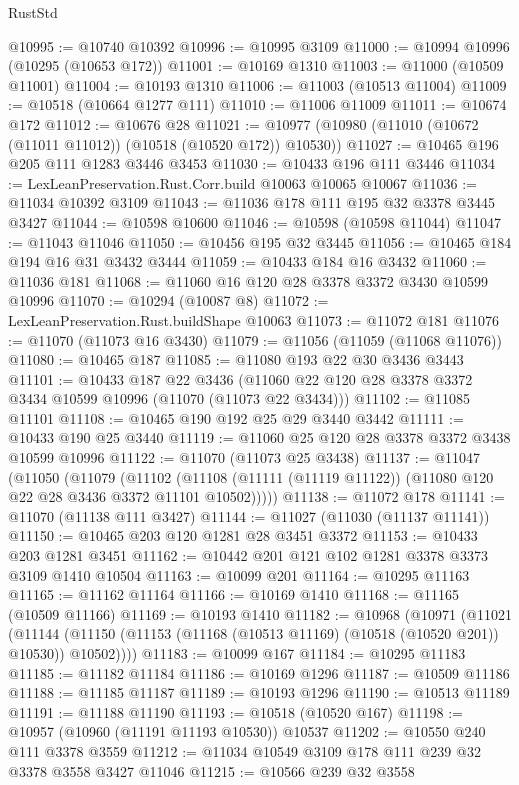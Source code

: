 \begin{lexlean}{RustStd}
\begin{coremodule}
@10995 := @10740 @10392
@10996 := @10995 @3109
@11000 := @10994 @10996 (@10295 (@10653 @172))
@11001 := @10169 @1310
@11003 := @11000 (@10509 @11001)
@11004 := @10193 @1310
@11006 := @11003 (@10513 @11004)
@11009 := @10518 (@10664 @1277 @111)
@11010 := @11006 @11009
@11011 := @10674 @172
@11012 := @10676 @28
@11021 := @10977 (@10980 (@11010 (@10672 (@11011 @11012)) (@10518 (@10520 @172)) @10530))
@11027 := @10465 @196 @205 @111 @1283 @3446 @3453
@11030 := @10433 @196 @111 @3446
@11034 := LexLeanPreservation.Rust.Corr.build @10063 @10065 @10067
@11036 := @11034 @10392 @3109
@11043 := @11036 @178 @111 @195 @32 @3378 @3445 @3427
@11044 := @10598 @10600
@11046 := @10598 (@10598 @11044)
@11047 := @11043 @11046
@11050 := @10456 @195 @32 @3445
@11056 := @10465 @184 @194 @16 @31 @3432 @3444
@11059 := @10433 @184 @16 @3432
@11060 := @11036 @181
@11068 := @11060 @16 @120 @28 @3378 @3372 @3430 @10599 @10996
@11070 := @10294 (@10087 @8)
@11072 := LexLeanPreservation.Rust.buildShape @10063
@11073 := @11072 @181
@11076 := @11070 (@11073 @16 @3430)
@11079 := @11056 (@11059 (@11068 @11076))
@11080 := @10465 @187
@11085 := @11080 @193 @22 @30 @3436 @3443
@11101 := @10433
    @187
    @22
    @3436
    (@11060 @22 @120 @28 @3378 @3372 @3434 @10599 @10996 (@11070 (@11073 @22 @3434)))
@11102 := @11085 @11101
@11108 := @10465 @190 @192 @25 @29 @3440 @3442
@11111 := @10433 @190 @25 @3440
@11119 := @11060 @25 @120 @28 @3378 @3372 @3438 @10599 @10996
@11122 := @11070 (@11073 @25 @3438)
@11137 := @11047
    (@11050
      (@11079
        (@11102 (@11108 (@11111 (@11119 @11122)) (@11080 @120 @22 @28 @3436 @3372 @11101 @10502)))))
@11138 := @11072 @178
@11141 := @11070 (@11138 @111 @3427)
@11144 := @11027 (@11030 (@11137 @11141))
@11150 := @10465 @203 @120 @1281 @28 @3451 @3372
@11153 := @10433 @203 @1281 @3451
@11162 := @10442 @201 @121 @102 @1281 @3378 @3373 @3109 @1410 @10504
@11163 := @10099 @201
@11164 := @10295 @11163
@11165 := @11162 @11164
@11166 := @10169 @1410
@11168 := @11165 (@10509 @11166)
@11169 := @10193 @1410
@11182 := @10968
    (@10971
      (@11021
        (@11144 (@11150 (@11153 (@11168 (@10513 @11169) (@10518 (@10520 @201)) @10530)) @10502))))
@11183 := @10099 @167
@11184 := @10295 @11183
@11185 := @11182 @11184
@11186 := @10169 @1296
@11187 := @10509 @11186
@11188 := @11185 @11187
@11189 := @10193 @1296
@11190 := @10513 @11189
@11191 := @11188 @11190
@11193 := @10518 (@10520 @167)
@11198 := @10957 (@10960 (@11191 @11193 @10530)) @10537
@11202 := @10550 @240 @111 @3378 @3559
@11212 := @11034 @10549 @3109 @178 @111 @239 @32 @3378 @3558 @3427 @11046
@11215 := @10566 @239 @32 @3558

\end{coremodule}
\end{lexlean}
